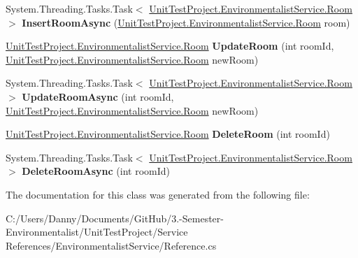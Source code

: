 \begin{DoxyCompactItemize}
\item 
\hypertarget{class_unit_test_project_1_1_environmentalist_service_1_1_service1_client_aa3fb7b872db10750aed8115cd5581e1d}{}System.\+Threading.\+Tasks.\+Task$<$ \hyperlink{class_unit_test_project_1_1_environmentalist_service_1_1_room}{Unit\+Test\+Project.\+Environmentalist\+Service.\+Room} $>$ {\bfseries Insert\+Room\+Async} (\hyperlink{class_unit_test_project_1_1_environmentalist_service_1_1_room}{Unit\+Test\+Project.\+Environmentalist\+Service.\+Room} room)\label{class_unit_test_project_1_1_environmentalist_service_1_1_service1_client_aa3fb7b872db10750aed8115cd5581e1d}

\item 
\hypertarget{class_unit_test_project_1_1_environmentalist_service_1_1_service1_client_a1a89d546a421abc1eab947c825fccb6b}{}\hyperlink{class_unit_test_project_1_1_environmentalist_service_1_1_room}{Unit\+Test\+Project.\+Environmentalist\+Service.\+Room} {\bfseries Update\+Room} (int room\+Id, \hyperlink{class_unit_test_project_1_1_environmentalist_service_1_1_room}{Unit\+Test\+Project.\+Environmentalist\+Service.\+Room} new\+Room)\label{class_unit_test_project_1_1_environmentalist_service_1_1_service1_client_a1a89d546a421abc1eab947c825fccb6b}

\item 
\hypertarget{class_unit_test_project_1_1_environmentalist_service_1_1_service1_client_afe761cc941f4f4d11e8c99c69dfcfc09}{}System.\+Threading.\+Tasks.\+Task$<$ \hyperlink{class_unit_test_project_1_1_environmentalist_service_1_1_room}{Unit\+Test\+Project.\+Environmentalist\+Service.\+Room} $>$ {\bfseries Update\+Room\+Async} (int room\+Id, \hyperlink{class_unit_test_project_1_1_environmentalist_service_1_1_room}{Unit\+Test\+Project.\+Environmentalist\+Service.\+Room} new\+Room)\label{class_unit_test_project_1_1_environmentalist_service_1_1_service1_client_afe761cc941f4f4d11e8c99c69dfcfc09}

\item 
\hypertarget{class_unit_test_project_1_1_environmentalist_service_1_1_service1_client_a43524a431aba0277e35dc7807ee77309}{}\hyperlink{class_unit_test_project_1_1_environmentalist_service_1_1_room}{Unit\+Test\+Project.\+Environmentalist\+Service.\+Room} {\bfseries Delete\+Room} (int room\+Id)\label{class_unit_test_project_1_1_environmentalist_service_1_1_service1_client_a43524a431aba0277e35dc7807ee77309}

\item 
\hypertarget{class_unit_test_project_1_1_environmentalist_service_1_1_service1_client_a61082f1e47a4bd8a67beae30d9d084cf}{}System.\+Threading.\+Tasks.\+Task$<$ \hyperlink{class_unit_test_project_1_1_environmentalist_service_1_1_room}{Unit\+Test\+Project.\+Environmentalist\+Service.\+Room} $>$ {\bfseries Delete\+Room\+Async} (int room\+Id)\label{class_unit_test_project_1_1_environmentalist_service_1_1_service1_client_a61082f1e47a4bd8a67beae30d9d084cf}

\end{DoxyCompactItemize}


The documentation for this class was generated from the following file\+:\begin{DoxyCompactItemize}
\item 
C\+:/\+Users/\+Danny/\+Documents/\+Git\+Hub/3.-\/\+Semester-\/\+Environmentalist/\+Unit\+Test\+Project/\+Service References/\+Environmentalist\+Service/Reference.\+cs\end{DoxyCompactItemize}
